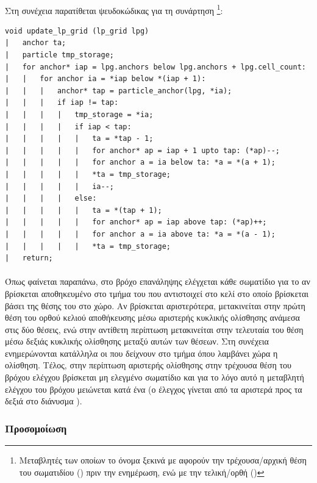 \paragraph{} Στη συνέχεια παρατίθεται ψευδοκώδικας για τη συνάρτηση
\footnote{Μεταβλητές των οποίων το όνομα ξεκινά με  αφορούν
  την τρέχουσα/αρχική θέση του σωματιδίου () πριν την ενημέρωση, ενώ με
   την τελική/ορθή ()}: 
\begin{verbatim}
void update_lp_grid (lp_grid lpg)
|   anchor ta;
|   particle tmp_storage;
|   for anchor* iap = lpg.anchors below lpg.anchors + lpg.cell_count:
|   |   for anchor ia = *iap below *(iap + 1):
|   |   |   anchor* tap = particle_anchor(lpg, *ia);
|   |   |   if iap != tap:
|   |   |   |   tmp_storage = *ia;
|   |   |   |   if iap < tap:
|   |   |   |   |   ta = *tap - 1;
|   |   |   |   |   for anchor* ap = iap + 1 upto tap: (*ap)--;
|   |   |   |   |   for anchor a = ia below ta: *a = *(a + 1);
|   |   |   |   |   *ta = tmp_storage;
|   |   |   |   |   ia--;
|   |   |   |   else:
|   |   |   |   |   ta = *(tap + 1);
|   |   |   |   |   for anchor* ap = iap above tap: (*ap)++;
|   |   |   |   |   for anchor a = ia above ta: *a = *(a - 1);
|   |   |   |   |   *ta = tmp_storage;
|   return;
\end{verbatim}

\paragraph{} Όπως φαίνεται παραπάνω, στο βρόχο επανάληψης ελέγχεται κάθε σωματίδιο για το
αν βρίσκεται αποθηκευμένο στο τμήμα του  που αντιστοιχεί στο κελί στο οποίο
βρίσκεται βάσει της θέσης του στο χώρο. Αν βρίσκεται αριστερότερα, μετακινείται στην πρώτη
θέση του ορθού κελιού αποθήκευσης μέσω αριστερής κυκλικής ολίσθησης ανάμεσα στις δύο
θέσεις, ενώ στην αντίθετη περίπτωση μετακινείται στην τελευταία του θέση μέσω δεξιάς
κυκλικής ολίσθησης μεταξύ αυτών των θέσεων. Στη συνέχεια ενημερώνονται κατάλληλα οι
 που δείχνουν στο τμήμα όπου λαμβάνει χώρα η ολίσθηση. Τέλος, στην περίπτωση
αριστερής ολίσθησης στην τρέχουσα θέση του βρόχου ελέγχου βρίσκεται μη ελεγμένο σωματίδιο
και για το λόγο αυτό η μεταβλητή ελέγχου του βρόχου  μειώνεται κατά ένα (ο έλεγχος
γίνεται από τα αριστερά προς τα δεξιά στο διάνυσμα ).

\subsubsection{Προσομοίωση}

